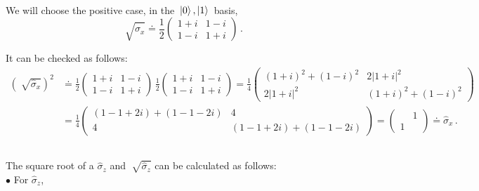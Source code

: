 \documentclass[11pt]{article}
\numberwithin{equation}{section} %
\numberwithin{figure}{section} %
\begin{document}
\begin{appendices}
\begin{equation}
\begin{split}
\end{split}
\end{equation}
We will choose the positive case, in the $\,{\ket{0},\ket{1}\,}$ basis,
\begin{equation} \label{proof_sqrt_sigma_x}
\sqrt[]{\hat{\sigma}_x} \doteq \frac{1}{2}\begin{pmatrix}1+i&1-i\\1-i&1+i\end{pmatrix}\,\textrm{.}
\end{equation} 

It can be checked as follows: 
\begin{equation}
\begin{split}
\left(\sqrt[]{\hat{\sigma}_x}\right)^2
&	\doteq \frac{1}{2}\begin{pmatrix}1+i&1-i\\1-i&1+i\end{pmatrix}\,\frac{1}{2}\begin{pmatrix}1+i&1-i\\1-i&1+i\end{pmatrix} = \frac{1}{4} \begin{pmatrix}(1+i)^2+(1-i)^2&2|1+i|^2\\2|1+i|^2&(1+i)^2+(1-i)^2\end{pmatrix}\\
&	= \frac{1}{4} \begin{pmatrix}(1-1+2i)+(1-1-2i)&4\\4&(1-1+2i)+(1-1-2i)\end{pmatrix} =\begin{pmatrix}&1\\1&\end{pmatrix} \doteq \hat{\sigma}_x\,.
\end{split}
\end{equation}





\vspace{0.5cm}
\subsection{} \label{sqrt_sigma_z}

The square root of a $\hat{\sigma}_z$ and $\sqrt[]{\hat{\sigma}_z}$ can be calculated as follows:\\

\noindent $\bullet$ For $\hat{\sigma}_z$, 


\end{appendices}
\end{document}
